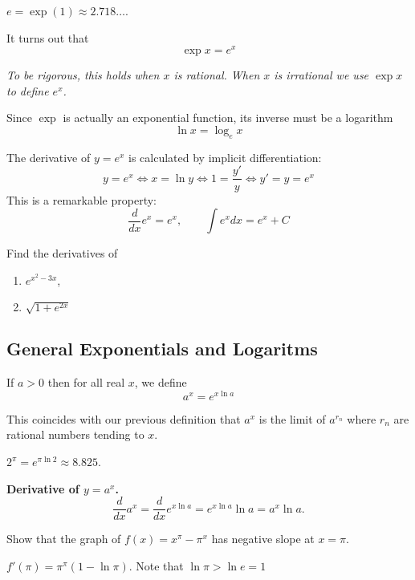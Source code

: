\documentclass[../main.tex]{subfiles}
\begin{document}
  \begin{definition}
    $e = \exp(1) \approx 2.718 \dots$.
  \end{definition}

  It turns out that
  \[
    \exp x = e^x
  \]

  \textit{To be rigorous, this holds when $x$ is rational. When $x$ is irrational we use $\exp x$ to define $e^x$.}

  Since $\exp$ is actually an exponential function, its inverse must be a logarithm
  \[
    \ln x = \log_e x
  \]

  The derivative of $y = e^x$ is calculated by implicit differentiation:
  \[
    y = e^x \iff
    x = \ln y \iff
    1 = \frac{y'}{y} \iff
    y' = y = e^x
  \]
  This is a remarkable property:
  \[
    \frac{d}{dx} e^x = e^x, \qquad \int e^x dx = e^x + C
  \]

  \begin{example}
    Find the derivatives of
    \begin{enumerate}
      \item $e^{x^2-3x}$,
      \item $\sqrt{1+e^{2x}}$
    \end{enumerate}
  \end{example}

  \subsection*{General Exponentials and Logaritms}
  \begin{definition}
    If $a>0$ then for all real $x$, we define
    \[
      a^x = e^{x \ln a}
    \]
  \end{definition}
  This coincides with our previous definition that $a^x$ is the limit of $a^{r_n}$ where $r_n$ are rational numbers tending to $x$.

  \begin{example}
    $2^{\pi} = e^{\pi \ln 2} \approx 8.825$.
  \end{example}

  \textbf{Derivative of $y=a^x$.}
  \[
    \frac{d}{dx} a^x = \frac{d}{dx} e^{x \ln a} = e^{x \ln a} \ln a = a^x \ln a.
  \]

  \begin{example}
    Show that the graph of $f(x) = x^{\pi} - \pi^x$ has negative slope at $x = \pi$.
  \end{example}
  \begin{solution}
    $f'(\pi) = \pi^{\pi} (1- \ln \pi)$. Note that $\ln \pi > \ln e = 1$
  \end{solution}
\end{document}
